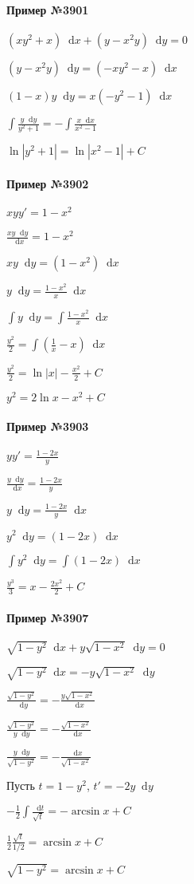 \documentclass{article}
\newcommand*\diff{\mathop{}\!\mathrm{d}}
\begin{document}
\begin{minipage}{0.49\textwidth}
    \paragraph{Пример №3901} $(xy^2 + x) \diff x + (y - x^2 y) \diff y = 0$

    $(y - x^2 y) \diff y = (-xy^2 - x) \diff x$

    $(1 - x)y \diff y = x (- y^2 - 1) \diff x$

    $\int \frac{y \diff y}{y^2 + 1} = - \int \frac{x \diff x}{x^2 - 1}$

    $\ln |y^2 + 1| = \ln |x^2 - 1| + C$
    \paragraph{Пример №3902}
    $xyy' = 1 - x^2$

    $\frac{x y \diff y}{\diff x} = 1 - x^2$

    $x y \diff y = (1 - x^2) \diff x$

    $y \diff y = \frac{1 - x^2}{x} \diff x$

    $\int y \diff y = \int \frac{1 - x^2}{x} \diff x$

    $\frac{y^2}{2} = \int (\frac{1}{x} - x) \diff x$

    $\frac{y^2}{2} = \ln |x| - \frac{x^2}{2} + C$

    $y^2 = 2 \ln x - x^2 + C$
    \paragraph{Пример №3903}
    $yy' = \frac{1 - 2x}{y}$

    $\frac{y \diff y}{\diff x} = \frac{1 - 2x}{y}$

    $y \diff y = \frac{1 - 2x}{y} \diff x$

    $y^2 \diff y = (1 - 2x) \diff x$

    $\int y^2 \diff y = \int (1 - 2x) \diff x$

    $\frac{y^3}{3} = x - \frac{2x^2}{2} + C$
    \paragraph{Пример №3907}
    $\sqrt{1 - y^2} \diff x + y \sqrt{1 - x^2} \diff y = 0$

    $\sqrt{1 - y^2} \diff x = -y\sqrt{1 - x^2} \diff y$

    $\frac{\sqrt{1 - y^2}}{\diff y} = -\frac{y\sqrt{1 - x^2}}{\diff x}$

    $\frac{\sqrt{1 - y^2}}{y \diff y} = -\frac{\sqrt{1 - x^2}}{\diff x}$

    $\frac{y \diff y}{\sqrt{1 - y^2}} = -\frac{\diff x}{\sqrt{1 - x^2}}$

    Пусть $t = 1 - y^2$, $t' = - 2y \diff y$

    $-\frac{1}{2} \int \frac{\diff t}{\sqrt{t}} = -\arcsin x + C$

    $\frac{1}{2} \frac{\sqrt{t}}{1/2} = \arcsin x + C$

    $\sqrt{1 - y^2} = \arcsin x + C$
\end{minipage}
\end{document}
